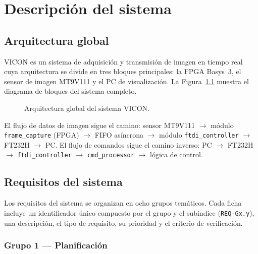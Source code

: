 \documentclass[../main.tex]{subfiles}
\begin{document}
\chapter{Descripción del sistema}
\label{chap:descripcion_sistema}

\section{Arquitectura global}

VICON es un sistema de adquisición y transmisión de imagen en tiempo real cuya arquitectura se divide en tres bloques principales: la FPGA Basys~3, el sensor de imagen MT9V111 y el PC de visualización. La Figura~\ref{fig:arquitectura_global} muestra el diagrama de bloques del sistema completo.

\begin{figure}[htbp]
    \centering
    \caption{Arquitectura global del sistema VICON.}
    \label{fig:arquitectura_global}
\end{figure}

El flujo de datos de imagen sigue el camino: sensor MT9V111 $\rightarrow$ módulo \texttt{frame\_capture} (FPGA) $\rightarrow$ FIFO asíncrona $\rightarrow$ módulo \texttt{ftdi\_controller} $\rightarrow$ FT232H $\rightarrow$ PC. El flujo de comandos sigue el camino inverso: PC $\rightarrow$ FT232H $\rightarrow$ \texttt{ftdi\_controller} $\rightarrow$ \texttt{cmd\_processor} $\rightarrow$ lógica de control.

\section{Requisitos del sistema}
\label{sec:requisitos}

Los requisitos del sistema se organizan en ocho grupos temáticos. Cada ficha incluye un identificador único compuesto por el grupo y el subíndice (\texttt{REQ-Gx.y}), una descripción, el tipo de requisito, su prioridad y el criterio de verificación.

\subsection{Grupo 1 — Planificación}
\end{document}
